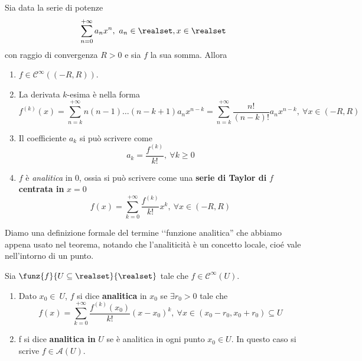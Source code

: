 \begin{theorema}
	Sia data la serie di potenze
	\begin{equation*}
		\sum_{n=0}^{+\infty}a_nx^n,\ a_n\in\realset, x\in\realset
	\end{equation*}
con raggio di convergenza $R>0$ e sia $f$ la sua somma. Allora
\begin{enumerate}
	\item $f\in\mathcal{C}^{\infty}\left(\left(-R,R\right)\right)$.
	\item La derivata $k$-esima è nella forma
	\begin{equation}
		f^{\left(k\right)}(x)=\sum_{n=k}^{+\infty}n\left(n-1\right)\ldots\left(n-k+1\right)a_nx^{n-k}=\sum_{n=k}^{+\infty}\frac{n!}{\left(n-k\right)!}a_nx^{n-k},\ \forall x\in\left(-R,R\right)
	\end{equation}
	\item Il coefficiente $a_k$ si può scrivere come
	\begin{equation}
		a_k=\frac{f^{\left(k\right)}}{k!},\ \forall k\geq 0
	\end{equation}
	\item $f$ è \textit{analitica} in $0$, ossia si può scrivere come una \textbf{serie di Taylor di }$f$\textbf{centrata in }$x=0$
	\begin{equation}
		f(x)=\sum_{k=0}^{+\infty}\frac{f^{\left(k\right)}}{k!}x^k,\ \forall x\in\left(-R,R\right)
	\end{equation}
\end{enumerate}
\end{theorema}
Diamo una definizione formale del termine ‘‘funzione analitica'' che abbiamo appena usato nel teorema, notando che l'analiticità è un concetto locale, cioé vale nell'intorno di un punto.
\begin{define}
	Sia $\funz{f}{U\subseteq \realset}{\realset}$ tale che $f\in\mathcal{C}^{\infty}\left(U\right)$.
	\begin{enumerate}
		\item Dato $x_0\in\ U$, $f$ si dice \textbf{analitica} in $x_0$ se $\exists r_0>0$ tale che
		\begin{equation*}
			f(x)=\sum_{k=0}^{+\infty}\frac{f^{\left(k\right)}\left(x_0\right)}{k!}\left(x-x_0\right)^k,\ \forall x\in\left(x_0-r_0,x_0+r_0\right)\subseteq U
		\end{equation*}
		\item f si dice \textbf{analitica in }$U$ se è analitica in ogni punto $x_0\in U$. In questo caso si scrive $f\in\mathcal{A}\left(U\right)$.
	\end{enumerate}
\end{define}
